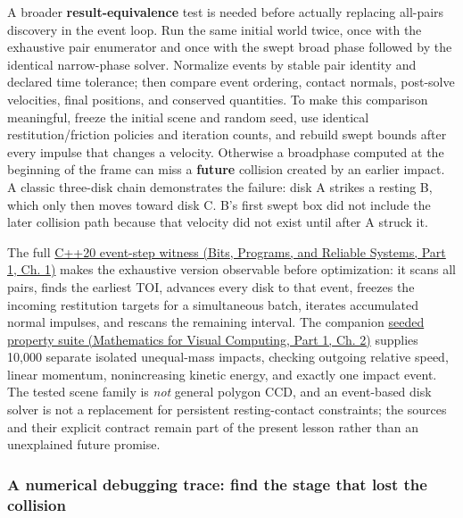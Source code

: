 A broader \textbf{result-equivalence} test is needed before actually replacing all-pairs discovery in the event loop. Run the same initial world twice, once with the exhaustive pair enumerator and once with the swept broad phase followed by the identical narrow-phase solver. Normalize events by stable pair identity and declared time tolerance; then compare event ordering, contact normals, post-solve velocities, final positions, and conserved quantities. To make this comparison meaningful, freeze the initial scene and random seed, use identical restitution/friction policies and iteration counts, and rebuild swept bounds after every impulse that changes a velocity. Otherwise a broadphase computed at the beginning of the frame can miss a \textbf{future} collision created by an earlier impact. A classic three-disk chain demonstrates the failure: disk A strikes a resting B, which only then moves toward disk C. B's first swept box did not include the later collision path because that velocity did not exist until after A struck it.

The full \href{../01-Bits-Programs-and-Reliable-Systems-P01/main.pdf\#nameddest=source-file-ad26f703e8f150d27a72bf93}{C++20 event-step witness (Bits, Programs, and Reliable Systems, Part 1, Ch. 1)} makes the exhaustive version observable before optimization: it scans all pairs, finds the earliest TOI, advances every disk to that event, freezes the incoming restitution targets for a simultaneous batch, iterates accumulated normal impulses, and rescans the remaining interval. The companion \href{../02-Mathematics-for-Visual-Computing-P01/main.pdf\#nameddest=source-file-50214a688c0ef812f3094877}{seeded property suite (Mathematics for Visual Computing, Part 1, Ch. 2)} supplies 10,000 separate isolated unequal-mass impacts, checking outgoing relative speed, linear momentum, nonincreasing kinetic energy, and exactly one impact event. The tested scene family is \emph{not} general polygon CCD, and an event-based disk solver is not a replacement for persistent resting-contact constraints; the sources and their explicit contract remain part of the present lesson rather than an unexplained future promise.

\subsubsection{A numerical debugging trace: find the stage that lost the collision}\label{04-visual-computing-ii-ch026-a-numerical-debugging-trace-find-the-stage-that-lost-the-collision}

